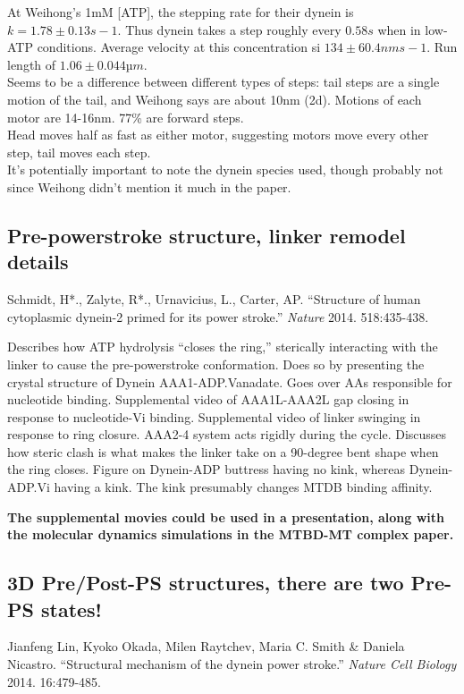 \documentclass[10pt]{article} %
\begin{document}
At Weihong's 1mM [ATP], the stepping rate for their dynein is $k = 1.78 ± 0.13 s−1$. Thus dynein takes a step roughly every $0.58s$ when in low-ATP conditions. Average velocity at this concentration si $134 ± 60.4 nm s−1$. Run length of $1.06 ± 0.044 µm$.\\

Seems to be a difference between different types of steps: tail steps are a single motion of the tail, and Weihong says are about 10nm (2d). Motions of each motor are 14-16nm. 77\% are forward steps.\\

Head moves half as fast as either motor, suggesting motors move every other step, tail moves each step.\\

It's potentially important to note the dynein species used, though probably not since Weihong didn't mention it much in the paper.\\

\subsection{}

\subsection{Pre-powerstroke structure, linker remodel details}
Schmidt, H*., Zalyte, R*., Urnavicius, L., Carter, AP. ``Structure of human cytoplasmic dynein-2 primed for its power stroke.'' \textit{Nature} 2014. 518:435-438.

Describes how ATP hydrolysis ``closes the ring,'' sterically interacting with the linker to cause the pre-powerstroke conformation. Does so by presenting the crystal structure of Dynein AAA1-ADP.Vanadate. Goes over AAs responsible for nucleotide binding. Supplemental video of AAA1L-AAA2L gap closing in response to nucleotide-Vi binding. Supplemental video of linker swinging in response to ring closure. AAA2-4 system acts rigidly during the cycle. Discusses how steric clash is what makes the linker take on a 90-degree bent shape when the ring closes. Figure on Dynein-ADP buttress having no kink, whereas Dynein-ADP.Vi having a kink. The kink presumably changes MTDB binding affinity.

\textbf{The supplemental movies could be used in a presentation, along with the molecular dynamics simulations in the MTBD-MT complex paper.}

\subsection{3D Pre/Post-PS structures, there are two Pre-PS states!}
Jianfeng Lin, Kyoko Okada, Milen Raytchev, Maria C. Smith \& Daniela Nicastro. ``Structural mechanism of the dynein power stroke.'' \textit{Nature Cell Biology} 2014. 16:479-485.
\end{document}
